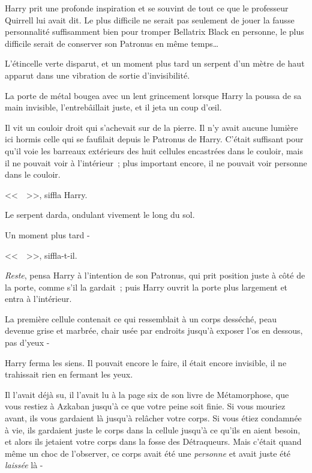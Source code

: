 Harry prit une profonde inspiration et se souvint de tout ce que le professeur Quirrell lui avait dit. Le plus difficile ne serait pas seulement de jouer la fausse personnalité suffisamment bien pour tromper Bellatrix Black en personne, le plus difficile serait de conserver son Patronus en même temps…

L'étincelle verte disparut, et un moment plus tard un serpent d'un mètre de haut apparut dans une vibration de sortie d'invisibilité.

La porte de métal bougea avec un lent grincement lorsque Harry la poussa de sa main invisible, l'entrebâillait juste, et il jeta un coup d'œil.

Il vit un couloir droit qui s'achevait sur de la pierre. Il n'y avait aucune lumière ici hormis celle qui se faufilait depuis le Patronus de Harry. C'était suffisant pour qu'il voie les barreaux extérieurs des huit cellules encastrées dans le couloir, mais il ne pouvait voir à l'intérieur~; plus important encore, il ne pouvait voir personne dans le couloir.

<<~~>>, siffla Harry.

Le serpent darda, ondulant vivement le long du sol.

Un moment plus tard -

<<~~>>, siffla-t-il.

\emph{Reste}, pensa Harry à l'intention de son Patronus, qui prit position juste à côté de la porte, comme s'il la gardait~; puis Harry ouvrit la porte plus largement et entra à l'intérieur.

La première cellule contenait ce qui ressemblait à un corps desséché, peau devenue grise et marbrée, chair usée par endroits jusqu'à exposer l'os en dessous, pas d'yeux -

Harry ferma les siens. Il pouvait encore le faire, il était encore invisible, il ne trahissait rien en fermant les yeux.

Il l'avait déjà su, il l'avait lu à la page six de son livre de Métamorphose, que vous restiez à Azkaban jusqu'à ce que votre peine soit finie. Si vous mouriez avant, ils vous gardaient là jusqu'à relâcher votre corps. Si vous étiez condamnée à vie, ils gardaient juste le corps dans la cellule jusqu'à ce qu'ils en aient besoin, et alors ils jetaient votre corps dans la fosse des Détraqueurs. Mais c'était quand même un choc de l'observer, ce corps avait été une \emph{personne} et avait juste été \emph{laissée} là -


